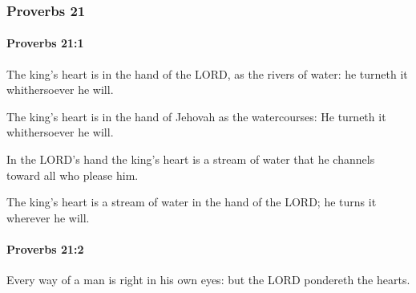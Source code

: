 	\subsubsection{Proverbs 21} %
		\label{PROVERBS-21}

		\paragraph{Proverbs 21:1} %
			\label{PROVERBS-21-1}

			The king’s heart is in the hand of the LORD, as the rivers of water: he turneth it whithersoever he will.

			\begin{versebox}
					\item[BHS] 
					\item[ASV] The king's heart is in the hand of Jehovah as the watercourses: He turneth it whithersoever he will.
					\item[NIV] In the LORD’s hand the king’s heart is a stream of water that he channels toward all who please him.
					\item[NRSV] The king’s heart is a stream of water in the hand of the LORD; he turns it wherever he will.
			\end{versebox}

		\paragraph{Proverbs 21:2} %
			\label{PROVERBS-21-2}

			Every way of a man is right in his own eyes: but the LORD pondereth the hearts.

